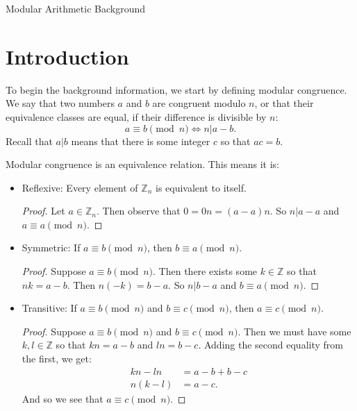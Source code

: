 \documentclass{article}
\begin{document}
\huge Modular Arithmetic Background
\normalsize
\section{Introduction}

To begin the background information, we start by defining modular congruence. We say that two numbers $a$ and $b$ are congruent modulo $n$, or that their equivalence classes are equal, if their difference is divisible by $n$:
\[
a\equiv b\pmod{n}\iff n|a-b
.\] 
Recall that $a|b$ means that there is some integer $c$ so that $ac=b$.

Modular congruence is an equivalence relation. This means it is:
\begin{itemize}

    \item Reflexive: Every element of $\mathbb{Z}_n$ is equivalent to itself.
        \begin{proof} 
            Let $a\in \mathbb{Z}_n$. Then observe that $0=0n=(a-a)n$. So $n|a-a$ and $a\equiv a\pmod{n}$.
        \end{proof}
    \item Symmetric: If $a\equiv b\pmod{n}$, then $b\equiv a \pmod{n}$.
        \begin{proof} 
            Suppose $a\equiv b\pmod{n}$. Then there exists some $k\in \mathbb{Z}$
            so that $nk=a-b$. Then $n(-k)=b-a$. So $n|b-a$ and $b\equiv a\pmod{n}$.
        \end{proof}
    \item Transitive: If $a\equiv b\pmod{n}$ and $b\equiv c\pmod{n}$, then $a\equiv c \pmod{n}$.
        \begin{proof} 
            Suppose $a\equiv b\pmod{n}$ and $b\equiv c\pmod{n}$. Then we must have
            some $k,l\in \mathbb{Z}$ so that $kn=a-b$ and $ln=b-c$. Adding
            the second equality from the first, we get:
            \begin{align*}
                kn- l n&= a-b+b-c \\
                n(k- l) &= a-c 
            .\end{align*}
            And so we see that $a\equiv c\pmod{n}$.
        \end{proof}
\end{itemize}
\end{document}
